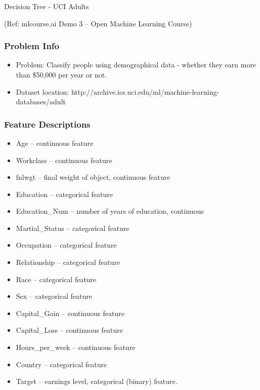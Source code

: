 \begin{frame}[fragile]\frametitle{}
\begin{center}
{\Large Decision Tree  - UCI Adults}

{\tiny (Ref: mlcourse.ai Demo 3 – Open Machine Learning Course) }

\end{center}

\end{frame}

\begin{frame}[fragile]\frametitle{Problem Info}	
\begin{itemize}
\item Problem: Classify people using demographical data - whether they earn more than \$50,000 per year or not.
\item Dataset location: http://archive.ics.uci.edu/ml/machine-learning-databases/adult
\end{itemize}
\end{frame}

\begin{frame}[fragile]\frametitle{Feature Descriptions}	
\begin{itemize}
\item Age – continuous feature
\item Workclass – continuous feature
\item fnlwgt – final weight of object, continuous feature
\item Education – categorical feature
\item Education\_Num – number of years of education, continuous
\item Martial\_Status – categorical feature
\item Occupation – categorical feature
\item Relationship – categorical feature
\item Race – categorical feature
\item Sex – categorical feature
\item Capital\_Gain – continuous feature
\item Capital\_Loss – continuous feature
\item Hours\_per\_week – continuous feature
\item Country – categorical feature
\item Target – earnings level, categorical (binary) feature.
\end{itemize}
\end{frame}

